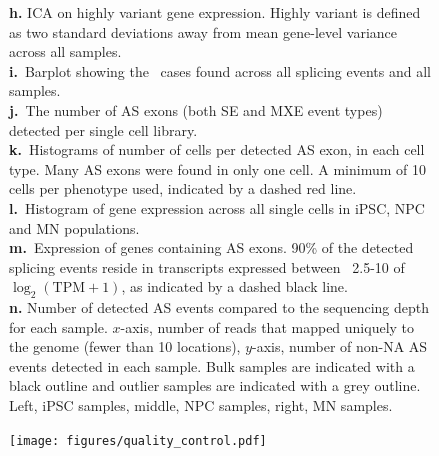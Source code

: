 \begin{figure}[h]
{\textbf{h.} ICA on highly variant gene expression. Highly variant is defined as two standard deviations away from mean gene-level variance across all samples.\\
\textbf{i.}~Barplot showing the \outrigger\, cases found across all splicing events and all samples.\\
\textbf{j.}~The number of AS exons (both SE and MXE event types) detected per single cell library. \\
\textbf{k.}~Histograms of number of cells per detected AS exon, in each cell type. Many AS exons were found in only one cell. A minimum of 10 cells per phenotype used, indicated by a dashed red line.\\
\textbf{l.}~Histogram of gene expression across all single cells in iPSC, NPC and MN populations.\\
\textbf{m.}~Expression of genes containing AS exons. 90\% of the detected splicing events reside in transcripts expressed between ~2.5-10 of $\log_2(\mathrm{TPM}+1)$, as indicated by a dashed black line. \\
\textbf{n.} Number of detected AS events compared to the sequencing depth for each sample. $x$-axis, number of reads that mapped uniquely to the genome (fewer than 10 locations), $y$-axis, number of non-NA AS events detected in each sample. Bulk samples are indicated with a black outline and outlier samples are indicated with a grey outline. Left, iPSC samples, middle, NPC samples, right, MN samples.
}
\label{fig:quality_control}
\end{figure}
\clearpage
\begin{figure}[h]
\ContinuedFloat
\captionsetup{labelformat=empty}
\centering
\texttt{[image: figures/quality\_control.pdf]}
\end{figure}
\clearpage



